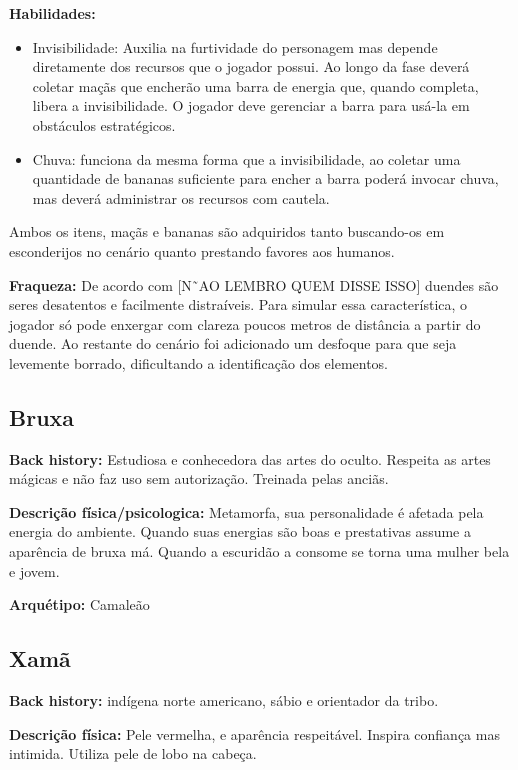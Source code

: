 \textbf{Habilidades: }
\begin{itemize}
\item  Invisibilidade: Auxilia na furtividade do personagem mas depende diretamente dos recursos que o jogador possui. Ao longo da fase deverá coletar maçãs que encherão uma barra de energia que, quando completa, libera a invisibilidade. O jogador deve gerenciar a barra para usá-la em obstáculos estratégicos.
\end{itemize}


\begin{itemize}
\item Chuva:  funciona da mesma forma que a invisibilidade, ao coletar uma quantidade de bananas suficiente para encher a barra poderá invocar chuva, mas deverá administrar os recursos com cautela.
\end{itemize}
Ambos os itens, maçãs e bananas são adquiridos tanto buscando-os em esconderijos no cenário quanto prestando favores aos humanos.

\textbf{Fraqueza:} De acordo com [N˜AO LEMBRO QUEM DISSE ISSO] duendes são seres desatentos e facilmente distraíveis. Para simular essa característica, o jogador só pode enxergar com clareza poucos metros de distância a partir do duende. Ao restante do cenário foi adicionado um desfoque para que seja levemente borrado, dificultando a identificação dos elementos.

\subsection{Bruxa}
\textbf{Back history:} Estudiosa e conhecedora das artes do oculto. Respeita as artes mágicas e não faz uso sem autorização. Treinada pelas anciãs.

\textbf{Descrição física/psicologica:} Metamorfa, sua personalidade é afetada pela energia do ambiente. Quando suas energias são boas e prestativas assume a aparência de bruxa má. Quando a escuridão a consome se torna uma mulher bela e jovem.

\textbf{Arquétipo: }Camaleão

\subsection{Xamã}

\textbf{Back history: }indígena norte americano, sábio e orientador da tribo.

\textbf{Descrição física: }Pele vermelha, e aparência respeitável. Inspira confiança mas intimida. Utiliza pele de lobo na cabeça.

